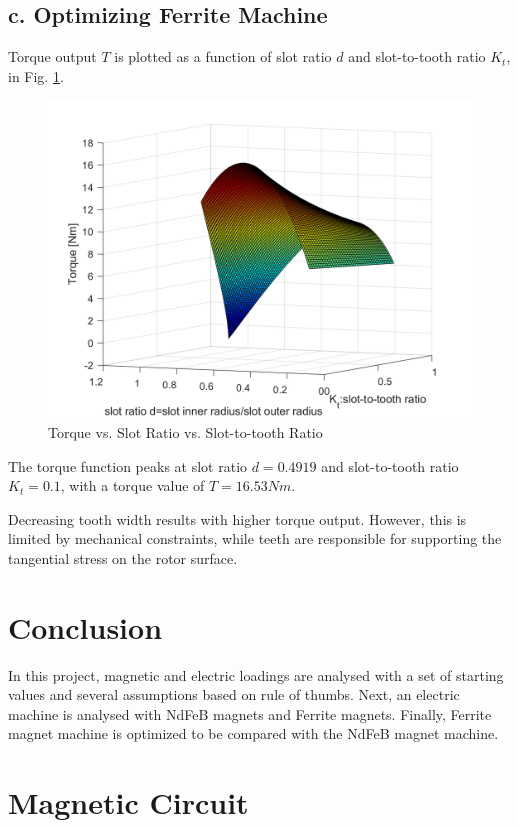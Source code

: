 \documentclass[a4paper, 11pt, titlepage]{article}
\begin{document}
\subsection{c. Optimizing Ferrite Machine}
Torque output $T$ is plotted as a function of slot ratio $d$ and slot-to-tooth ratio $K_t$, in Fig. \ref{fig:TvsDvsKt_Ferrite}.
\begin{figure}[h]
	\includegraphics[width=\textwidth]{torquevsDvsKt_Ferrite.png}
	\caption{Torque vs. Slot Ratio vs. Slot-to-tooth Ratio}
	\label{fig:TvsDvsKt_Ferrite}
\end{figure}
The torque function peaks at slot ratio $d=0.4919$ and slot-to-tooth ratio $K_t=0.1$, with a torque value of $T=16.53Nm$.

Decreasing tooth width results with higher torque output. However, this is limited by mechanical constraints, while teeth are responsible for supporting the tangential stress on the rotor surface.
\section{Conclusion}

In this project, magnetic and electric loadings are analysed with a set of starting values and several assumptions based on rule of thumbs. Next, an electric machine is analysed with NdFeB magnets and Ferrite magnets. Finally, Ferrite magnet machine is optimized to be compared with the NdFeB magnet machine.

\appendix


\section{Magnetic Circuit}
\label{app:magneticCircuit}
\end{document}
